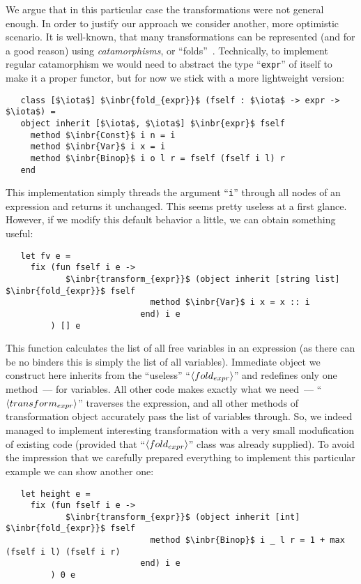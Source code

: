 We argue that in this particular case the transformations were not general enough. In order to justify our approach we consider another, more optimistic scenario. It is
well-known, that many transformations can be represented (and for a good reason) using \emph{catamorphisms}, or ``folds''~\cite{Fold,Bananas,CalculatingFP}. Technically, to
implement regular catamorphism we would need to abstract the type ``\lstinline{expr}'' of itself to make it a proper functor, but for now we stick with a more
lightweight version:

\begin{lstlisting}
   class [$\iota$] $\inbr{fold_{expr}}$ (fself : $\iota$ -> expr -> $\iota$) =
   object inherit [$\iota$, $\iota$] $\inbr{expr}$ fself
     method $\inbr{Const}$ i n = i
     method $\inbr{Var}$ i x = i
     method $\inbr{Binop}$ i o l r = fself (fself i l) r
   end
\end{lstlisting}

This implementation simply threads the argument ``\lstinline{i}'' through all nodes of an expression and returns it unchanged. This seems pretty useless at a first
glance. However, if we modify this default behavior a little, we can obtain something useful:

\begin{lstlisting}
   let fv e =
     fix (fun fself i e ->
            $\inbr{transform_{expr}}$ (object inherit [string list] $\inbr{fold_{expr}}$ fself
                             method $\inbr{Var}$ i x = x :: i
                           end) i e
         ) [] e
\end{lstlisting}

This function calculates the list of all free variables in an expression (as there can be no binders this is simply the list of all variables). Immediate object we
construct here inherits from the ``useless'' ``$\left<fold_{expr}\right>$'' and redefines only one method~--- for variables. All other code makes exactly what we need~---
``$\left<transform_{expr}\right>$'' traverses the expression, and all other methods of transformation object accurately pass the list of variables through. So, we indeed
managed to implement interesting transformation with a very small modufication of existing code (provided that ``$\left<fold_{expr}\right>$'' class was already supplied).
To avoid the impression that we carefully prepared everything to implement this particular example we can show another one:

\begin{lstlisting}
   let height e =
     fix (fun fself i e ->
            $\inbr{transform_{expr}}$ (object inherit [int] $\inbr{fold_{expr}}$ fself
                             method $\inbr{Binop}$ i _ l r = 1 + max (fself i l) (fself i r) 
                           end) i e
         ) 0 e
\end{lstlisting}

